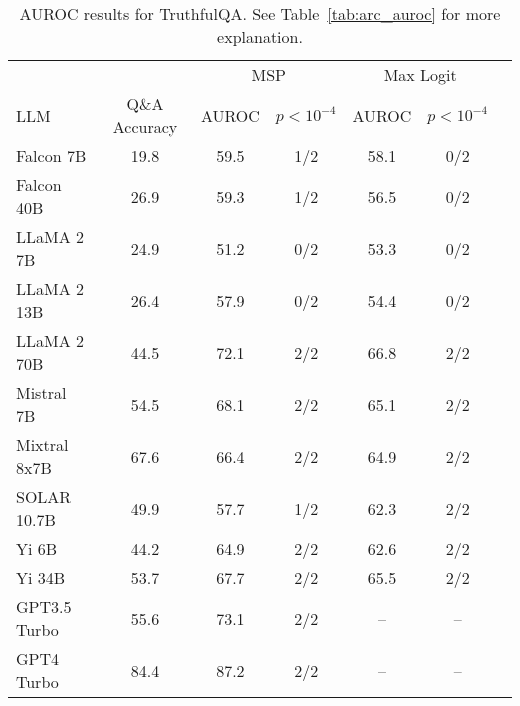 \begin{table*}
\centering
\caption{AUROC results for TruthfulQA. See Table~\ref{tab:arc_auroc} for more explanation.}
\label{tab:truthfulqa_auroc}
\begin{tabular}{lcccccc}
\toprule
& & \multicolumn{2}{c}{MSP} & \multicolumn{2}{c}{Max Logit} \\ 
LLM & Q\&A Accuracy & AUROC & $p < 10^{-4}$ & AUROC & $p < 10^{-4}$\\ 
\cmidrule(lr){1-1} \cmidrule(lr){2-2} \cmidrule(lr){3-4} \cmidrule(lr){5-6}
Falcon 7B & 19.8 & 59.5 & 1/2 & 58.1 & 0/2 \\
Falcon 40B & 26.9 & 59.3 & 1/2 & 56.5 & 0/2 \\
LLaMA 2 7B & 24.9 & 51.2 & 0/2 & 53.3 & 0/2 \\
LLaMA 2 13B & 26.4 & 57.9 & 0/2 & 54.4 & 0/2 \\
LLaMA 2 70B & 44.5 & 72.1 & 2/2 & 66.8 & 2/2 \\
Mistral 7B & 54.5 & 68.1 & 2/2 & 65.1 & 2/2 \\
Mixtral 8x7B & 67.6 & 66.4 & 2/2 & 64.9 & 2/2 \\
SOLAR 10.7B & 49.9 & 57.7 & 1/2 & 62.3 & 2/2 \\
Yi 6B & 44.2 & 64.9 & 2/2 & 62.6 & 2/2 \\
Yi 34B & 53.7 & 67.7 & 2/2 & 65.5 & 2/2 \\
GPT3.5 Turbo & 55.6 & 73.1 & 2/2 & -- & -- \\
GPT4 Turbo & 84.4 & 87.2 & 2/2 & -- & -- \\
\bottomrule
\end{tabular}
\end{table*}


